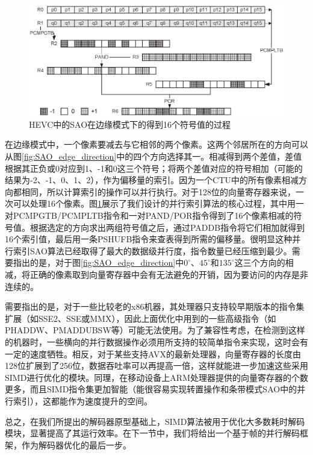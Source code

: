 \begin{figure}[t]
	\centering
	\includegraphics[width = 0.95\linewidth]{eps/SAO_edge_parallel_index}
	\caption{\label{fig:SAO_edge_parallel_index}HEVC中的SAO在边缘模式下的得到16个符号值的过程}
\end{figure}

在边缘模式中，一个像素要减去与它相邻的两个像素。这两个邻居所在的方向可以从图\ref{fig:SAO_edge_direction}中的四个方向选择其一。相减得到两个差值，差值根据其正负或0对应到1、-1和0这三个符号；将两个差值对应的符号相加（可能的结果为-2、-1、0、1、2），作为偏移量的索引。因为一个CTU中的所有像素相减方向都相同，所以计算索引的操作可以并行执行。对于128位的向量寄存器来说，一次可以处理16个像素。图\ref{fig:SAO_edge_parallel_index}展示了我们设计的并行索引算法的核心过程，其中用一对PCMPGTB/PCMPLTB指令和一对PAND/POR指令得到了16个像素相减的符号值。根据选定的方向求出两组符号值之后，通过PADDB指令将它们相加就得到16个索引值，最后用一条PSHUFB指令来查表得到所需的偏移量。很明显这种并行索引SAO算法已经取得了最大的数据级并行度，指令数量已经压缩到最少。需要指出的是，对于图\ref{fig:SAO_edge_direction}中$0^\circ$、$45^\circ$和$135^\circ$这三个方向的相减，将正确的像素取到向量寄存器中会有无法避免的开销，因为要访问的内存是非连续的。


需要指出的是，对于一些比较老的x86机器，其处理器只支持较早期版本的指令集扩展（如SSE2、SSE或MMX），因此上面优化中用到的一些高级指令（如PHADDW、PMADDUBSW等）可能无法使用。为了兼容性考虑，在检测到这样的机器时，一些横向的并行数据操作必须用所支持的较简单指令来实现，这时会有一定的速度牺牲。相反，对于某些支持AVX的最新处理器，向量寄存器的长度由128位扩展到了256位，数据吞吐率可以再提高一倍，这样就能进一步加速这些采用SIMD进行优化的模块。同理，在移动设备上ARM处理器提供的向量寄存器的个数更多，而且SIMD指令集更加智能（能很容易实现转置操作和条带模式SAO中的并行索引），这都能作为速度提升的空间。

总之，在我们所提出的解码器原型基础上，SIMD算法被用于优化大多数耗时解码模块，显著提高了其运行效率。在下一节中，我们将给出一个基于帧的并行解码框架，作为解码器优化的最后一步。

